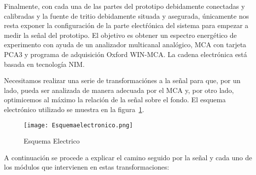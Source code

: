 Finalmente, con cada una de las partes del prototipo debidamente conectadas y calibradas y la fuente de tritio debidamente situada y asegurada, únicamente nos resta exponer la  configuración de la parte electŕónica del sistema para empezar a medir la señal del prototipo. El objetivo es obtener un espectro energético de experimento con ayuda de un analizador multicanal analógico, MCA con tarjeta PCA3 y programa de adquisición Oxford WIN-MCA. La cadena electrónica   está basada en  tecnología NIM.

Necesitamos realizar una serie de transformaciónes a la señal para que, por un lado,  pueda ser analizada de manera adecuada por el MCA y, por otro lado, optimicemos al máximo la relación de la  señal sobre el fondo. El esquema electrónico utilizado se muestra en la figura~\ref{electronica}.

\begin{figure}[hbtp]
\centering
\texttt{[image: Esquemaelectronico.png]}
\caption{Esquema Electrico~\cite{Andres}\label{electronica}}
\end{figure}

 A continuación se procede a explicar el camino seguido por la señal y cada uno de los módulos que intervienen en estas transformaciones:

